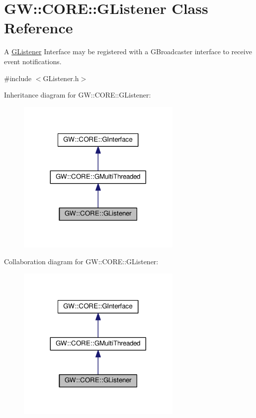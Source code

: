 \hypertarget{classGW_1_1CORE_1_1GListener}{}\section{GW\+:\+:C\+O\+RE\+:\+:G\+Listener Class Reference}
\label{classGW_1_1CORE_1_1GListener}


A \hyperlink{classGW_1_1CORE_1_1GListener}{G\+Listener} Interface may be registered with a G\+Broadcaster interface to receive event notifications.  




{\ttfamily \#include $<$G\+Listener.\+h$>$}



Inheritance diagram for GW\+:\+:C\+O\+RE\+:\+:G\+Listener\+:\nopagebreak
\begin{figure}[H]
\begin{center}
\leavevmode
\includegraphics[width=224pt]{classGW_1_1CORE_1_1GListener__inherit__graph}
\end{center}
\end{figure}


Collaboration diagram for GW\+:\+:C\+O\+RE\+:\+:G\+Listener\+:\nopagebreak
\begin{figure}[H]
\begin{center}
\leavevmode
\includegraphics[width=224pt]{classGW_1_1CORE_1_1GListener__coll__graph}
\end{center}
\end{figure}
